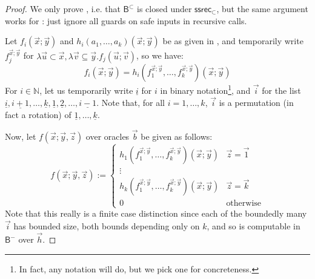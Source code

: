 \documentclass[manuscript,screen]{acmart}
\newcommand{\dfn}{:=}
\theoremstyle{definition}
\theoremstyle{remark}
\newcommand{\Nat}{\mathbb{N}}
\newcommand{\permpref}{\subset}
\newcommand{\permprefeq}{\subseteq}
\newcommand{\numeral}[1]{\underline{#1}}
\newcommand{\permi}[1]{\vec{#1}}
\newcommand{\ssrecwfpo}[1]{\mathsf{ssrec}_{#1}}
\newcommand{\ssrecpp}{\ssrecwfpo{\permpref}}
\newcommand{\bc}{\mathsf{B}}
\newcommand{\bcwfpo}[1]{\bc^{#1}}
\newcommand{\bcnorec}{\bc^{-}}
\newcommand{\bcpp}{\bcwfpo{\permpref}}
\begin{document}
\begin{proof}
We only prove , i.e. that $\bcpp$ is closed under $\ssrecpp$, but the same argument works for : just ignore all guards on safe inputs in recursive calls.


Let $f_i(\vec x;\vec y)$ and $h_i(a_1, \dots, a_k)(\vec x; \vec y)$ be as given in , and temporarily write $f_j^{\vec x;\vec y}$ for $\lambda \vec u \permpref \vec x, \lambda \vec v \permprefeq \vec y . f_j (\vec u;\vec v)$, so we have:
\[
f_i(\vec x;\vec y) = h_i (f_1^{\vec x; \vec y}, \dots, f_k^{\vec x;\vec y})(\vec x; \vec y)
\]
For $i\in \Nat$, let us temporarily write $\numeral i$ for $i$ in binary notation\footnote{In fact, any notation will do, but we pick one for concreteness.}, and $\permi i$ for the list $\numeral i, \numeral{i+1}, \dots, \numeral k, \numeral 1, \numeral 2, \dots, \numeral{i-1}$.
Note that, for all $i=1, \dots, k$, $\permi i$ is a permutation (in fact a rotation) of $\numeral 1, \dots, \numeral k$.

Now, let $f(\vec x; \vec y, \vec z)$ over oracles $\vec b$ be given as follows:
\begin{equation}
    \label{eq:sim-rec-reduction}
    f(\vec x; \vec y, \vec z) \dfn \begin{cases}
h_1 (f_1^{\vec x;\vec y}, \dots, f_k^{\vec x; \vec y})(\vec x;\vec y) & \vec z = \permi 1 \\
\vdots \\
h_k (f_1^{\vec x;\vec y}, \dots, f_k^{\vec x; \vec y})(\vec x;\vec y) & \vec z = \permi k \\
0 & \text{otherwise}
\end{cases}
\end{equation}
Note that this really is a finite case distinction since each of the boundedly many $\permi i$ has bounded size, both bounds depending only on $k$, and so is computable in $\bcnorec$ over $\vec h$. 


\end{proof}
\end{document}
